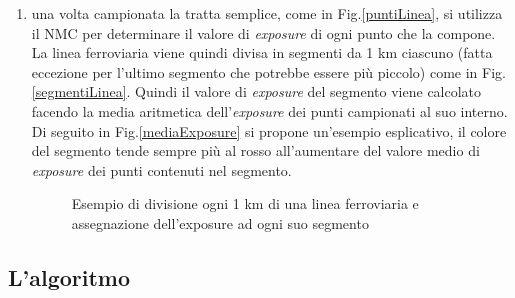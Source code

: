 \begin{enumerate}
\item una volta campionata la tratta semplice, come in Fig.\ref{puntiLinea}, si utilizza il NMC per determinare il valore di \textit{exposure} di ogni punto che la compone. \newline
La linea ferroviaria viene quindi divisa in segmenti da 1 km ciascuno (fatta eccezione per l'ultimo segmento che potrebbe essere più piccolo) come in Fig.\ref{segmentiLinea}. Quindi il valore di \textit{exposure}  del segmento viene calcolato facendo la media aritmetica dell'\textit{exposure} dei punti campionati al suo interno. Di seguito in Fig.\ref{mediaExposure}  si propone un'esempio esplicativo, il colore del segmento tende sempre più al rosso all'aumentare del valore medio di \textit{exposure} dei punti contenuti nel segmento.

\begin{figure}[bth]
	\myfloatalign
	 \quad
	\caption[dove]{Esempio di divisione ogni 1 km di una linea ferroviaria e assegnazione dell'exposure  ad ogni suo segmento }
	\label{fig:aggregazioneLinea}
\end{figure}


\end{enumerate}




\subsection{L'algoritmo}